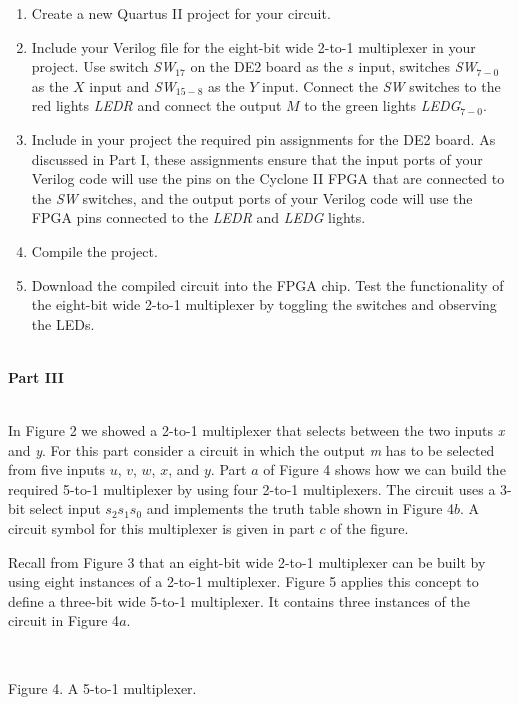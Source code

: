 \documentclass[psfig,10pt,fullpage]{article}
\begin{document}
\begin{enumerate}
\item Create a new Quartus II project for your circuit.
\item Include your Verilog file for the eight-bit wide 2-to-1 multiplexer 
in your project. Use switch {\it SW}$_{17}$ on the DE2 board as the $s$ input, switches
{\it SW}$_{7-0}$ as the $X$ input and 
{\it SW}$_{15-8}$ as the $Y$ input. Connect the {\it SW} switches
to the red lights {\it LEDR} and connect the output $M$ to the green lights {\it LEDG}$_{7-0}$.
\item Include in your project the required pin assignments for the DE2 board. As discussed
in Part I, these 
assignments ensure that the input ports of your Verilog code will use the pins on the Cyclone 
II FPGA that are connected to the {\it SW} switches, and the output ports of your Verilog code
will use the FPGA pins connected to the {\it LEDR} and {\it LEDG} lights. 
\item Compile the project.
\item Download the compiled circuit into the FPGA chip. Test the functionality of the 
eight-bit wide 2-to-1 multiplexer by toggling the switches and observing the LEDs.
\end{enumerate}

~\\
\noindent
{\bf Part III}

~\\
\noindent
In Figure 2 we showed a 2-to-1 multiplexer that selects between the two inputs {\it x} and {\it
y}. For this part consider a circuit in which the output {\it m} has to be selected from
five inputs $u$, $v$, $w$, $x$, and $y$. Part $a$ of Figure 4 shows how we can build the
required 5-to-1 multiplexer by using four 2-to-1 multiplexers. The circuit uses a 3-bit
select input $s_2 s_1 s_0$ and implements the truth table shown in Figure 4$b$. A circuit
symbol for this multiplexer is given in part $c$ of the figure. 

Recall from Figure 3
that an eight-bit wide 2-to-1 multiplexer can be built by using eight instances of a 2-to-1
multiplexer. Figure 5 applies this concept to define a three-bit wide 5-to-1 multiplexer. It
contains three instances of the circuit in Figure 4$a$.

\begin{figure}[H]
\scriptsize
\centerline{
\hbox{}}
\end{figure}
~\\
\centerline{Figure 4.  A 5-to-1 multiplexer.}
~\\
\end{document}
